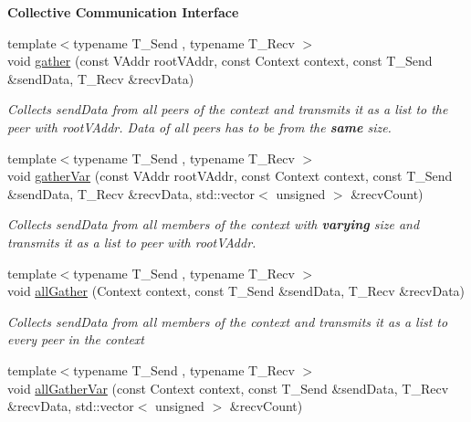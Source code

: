 \begin{Indent}{\bf Collective Communication Interface}\par
\begin{DoxyCompactItemize}
\item 
{\footnotesize template$<$typename T\+\_\+\+Send , typename T\+\_\+\+Recv $>$ }\\void \hyperlink{structgraybat_1_1communicationPolicy_1_1Base_a3db000db20b6cb8fd6e63f3d53e82090}{gather} (const V\+Addr root\+V\+Addr, const Context context, const T\+\_\+\+Send \&send\+Data, T\+\_\+\+Recv \&recv\+Data)
\begin{DoxyCompactList}\small\item\em Collects {\itshape send\+Data} from all peers of the {\itshape context} and transmits it as a list to the peer with {\itshape root\+V\+Addr}. Data of all peers has to be from the {\bfseries same} size. \end{DoxyCompactList}\item 
{\footnotesize template$<$typename T\+\_\+\+Send , typename T\+\_\+\+Recv $>$ }\\void \hyperlink{structgraybat_1_1communicationPolicy_1_1Base_a1434994bead59ef38b6eff8346538f0b}{gather\+Var} (const V\+Addr root\+V\+Addr, const Context context, const T\+\_\+\+Send \&send\+Data, T\+\_\+\+Recv \&recv\+Data, std\+::vector$<$ unsigned $>$ \&recv\+Count)
\begin{DoxyCompactList}\small\item\em Collects {\itshape send\+Data} from all members of the {\itshape context} with {\bfseries varying} size and transmits it as a list to peer with {\itshape root\+V\+Addr}. \end{DoxyCompactList}\item 
{\footnotesize template$<$typename T\+\_\+\+Send , typename T\+\_\+\+Recv $>$ }\\void \hyperlink{structgraybat_1_1communicationPolicy_1_1Base_a1b409ea49d7aba2dee0c83e28dda1b65}{all\+Gather} (Context context, const T\+\_\+\+Send \&send\+Data, T\+\_\+\+Recv \&recv\+Data)
\begin{DoxyCompactList}\small\item\em Collects {\itshape send\+Data} from all members of the {\itshape context} and transmits it as a list to every peer in the {\itshape context} \end{DoxyCompactList}\item 
{\footnotesize template$<$typename T\+\_\+\+Send , typename T\+\_\+\+Recv $>$ }\\void \hyperlink{structgraybat_1_1communicationPolicy_1_1Base_a1bad18907fcc45db9d4a119e726061a8}{all\+Gather\+Var} (const Context context, const T\+\_\+\+Send \&send\+Data, T\+\_\+\+Recv \&recv\+Data, std\+::vector$<$ unsigned $>$ \&recv\+Count)

\end{DoxyCompactItemize}
\end{Indent}
